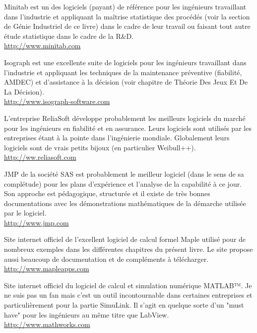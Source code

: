 	{\Large {}}{\Large {}}{\Large {}}{\Large {}} Minitab est un des logiciels (payant) de référence pour les ingénieurs travaillant dans l'industrie et appliquant la maîtrise statistique des procédés (voir la section de Génie Industriel de ce livre) dans le cadre de leur travail ou faisant tout autre étude statistique dans le cadre de la R\&D.\\
	\href{http://www.minitab.com}{\color{blue}http://www.minitab.com}
	
	{\Large {}}{\Large {}}{\Large {}}{\Large {}} Isograph est une excellente suite de logiciels pour les ingénieurs travaillant dans l'industrie et appliquant les techniques de la maintenance préventive (fiabilité, AMDEC) et d'assistance à la décision (voir chapitre de Théorie Des Jeux Et De La Décision).\\
	\href{http://www.isograph-software.com}{\color{blue}http://www.isograph-software.com}
	
	{\Large {}}{\Large {}}{\Large {}}{\Large {}} L'entreprise ReliaSoft développe probablement les meilleurs logiciels du marché pour les ingénieurs en fiabilité et en assurance. Leurs logiciels sont utilisés par les entreprises étant à la pointe dans l'ingénierie mondiale. Globalement leurs logiciels sont de vrais petits bijoux (en particulier Weibull++).\\
	\href{http://ww.reliasoft.com}{\color{blue}http://ww.reliasoft.com}
	
	{\Large {}}{\Large {}}{\Large {}} JMP de la société SAS est probablement le meilleur logiciel (dans le sens de sa complétude) pour les plans d'expérience et l'analyse de la capabilité à ce jour. Son approche est pédagogique, structurée et il existe de très bonnes documentations avec les démonstrations mathématiques de la démarche utilisée par le logiciel.\\
	\href{http://www.jmp.com}{\color{blue}http://www.jmp.com}
	
	{\Large {}}{\Large {}}{\Large {}}{\Large {}} Site internet officiel de l'excellent logiciel de calcul formel Maple utilisé pour de nombreux exemples dans les différentes chapitres du présent livre. Le site propose aussi beaucoup de documentation et de compléments à télécharger.\\
	\href{http://www.mapleapps.com}{\color{blue}http://www.mapleapps.com}
	
	{\Large {}}{\Large {}}{\Large {}} Site internet officiel du logiciel de calcul et simulation numérique MATLAB™. Je ne suis pas un fan mais c'est un outil incontournable dans certaines entreprises et particulièrement pour la partie SimuLink. Il s'agit en quelque sorte d'un "must have" pour les ingénieurs au même titre que LabView.\\
	\href{http://www.mathworks.com}{\color{blue}http://www.mathworks.com}
	
